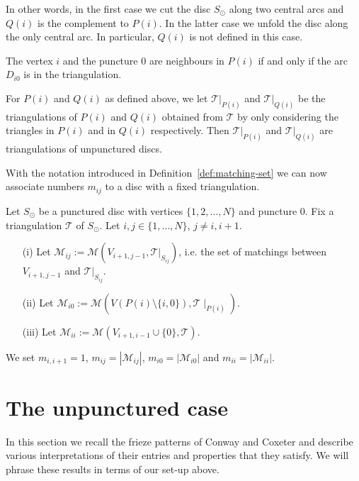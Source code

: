 \documentclass[a4paper]{amsart}
\begin{document}
In other words, in the first case we cut the disc $S_{\odot}$ along
two
central arcs and $Q(i)$ is the complement to $P(i)$.
In the latter case we unfold the disc along the only central
arc. In particular, $Q(i)$ is not defined in this case.

\begin{remark}
The vertex $i$ and the puncture $0$ are neighbours
in $P(i)$ if
and only if the arc $D_{i0}$ is in the triangulation.
\end{remark}

\begin{definition}
For $P(i)$ and $Q(i)$ as defined above, we let ${\mathcal T}|_{P(i)}$
and ${\mathcal T}|_{Q(i)}$ be the triangulations of $P(i)$ and $Q(i)$
obtained from ${\mathcal T}$ by only considering the
triangles in $P(i)$ and in $Q(i)$ respectively.
Then ${\mathcal T}|_{P(i)}$ and ${\mathcal T}|_{Q(i)}$
are triangulations of unpunctured discs.
\end{definition}

With the notation introduced in Definition~\ref{def:matching-set}
we can now associate numbers $m_{ij}$ to a disc with a fixed
triangulation.

\begin{definition} \label{def:matchingnumbers}
Let $S_{\odot}$ be a punctured disc with vertices
$\{1,2,\dots,N\}$ and puncture $0$.
Fix a triangulation ${\mathcal T}$ of $S_{\odot}$. Let $i,j \in\{1,\dots,N\}$,
$j\neq i,i+1$.
\begin{itemize}
\item[(i)] 
Let ${\mathcal M}_{ij}:={\mathcal M}(V_{i+1,j-1},{\mathcal T}|_{S_{ij}})$, i.e. 
the set of matchings between $V_{i+1,j-1}$ and ${\mathcal T}|_{S_{ij}}$.
\item[(ii)] 
Let ${\mathcal M}_{i0}:={\mathcal M}(V(P(i)\setminus\{i,0\}),{\mathcal T}\mid_{P(i)})$.
\item[(iii)] 
Let ${\mathcal M}_{ii}:={\mathcal M}(V_{i+1,i-1}\cup\{0\},{\mathcal T})$.
\end{itemize}
We set $m_{i,i+1}=1$, $m_{ij}=|{\mathcal M}_{ij}|$,
$m_{i0}=|{\mathcal M}_{i0}|$ and $m_{ii}=|{\mathcal M}_{ii}|$.
\end{definition}

\section{The unpunctured case}
\label{sec:unpuncturedcase}

In this section we recall the frieze patterns of Conway and Coxeter
and describe various interpretations of their entries and properties
that they satisfy. We will phrase these results in terms of our set-up
above.
\end{document}
